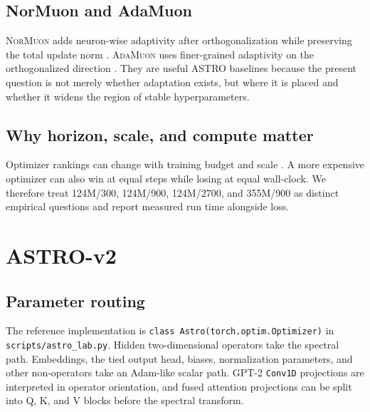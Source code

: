 \documentclass[10pt,twocolumn]{article}
\newcommand{\NorMuon}{\textsc{NorMuon}\xspace}
\newcommand{\AdaMuon}{\textsc{AdaMuon}\xspace}
\begin{document}
\subsection{NorMuon and AdaMuon}
\NorMuon adds neuron-wise adaptivity after orthogonalization while preserving the
total update norm \citep{li2025normuon}. \AdaMuon uses finer-grained adaptivity
on the orthogonalized direction \citep{si2025adamuon}. They are useful ASTRO
baselines because the present question is not merely whether adaptation exists,
but where it is placed and whether it widens the region of stable
hyperparameters.

\subsection{Why horizon, scale, and compute matter}
Optimizer rankings can change with training budget and scale
\citep{wen2025fantastic}. A more expensive optimizer can also win at equal steps
while losing at equal wall-clock. We therefore treat 124M/300, 124M/900,
124M/2700, and 355M/900 as distinct empirical questions and report measured run
time alongside loss.

\section{ASTRO-v2}

\subsection{Parameter routing}
The reference implementation is \texttt{class Astro(torch.optim.Optimizer)} in
\texttt{scripts/astro\_lab.py}. Hidden two-dimensional operators take the
spectral path. Embeddings, the tied output head, biases, normalization
parameters, and other non-operators take an Adam-like scalar path. GPT-2
\texttt{Conv1D} projections are interpreted in operator orientation, and fused
attention projections can be split into Q, K, and V blocks before the spectral
transform.
\end{document}

